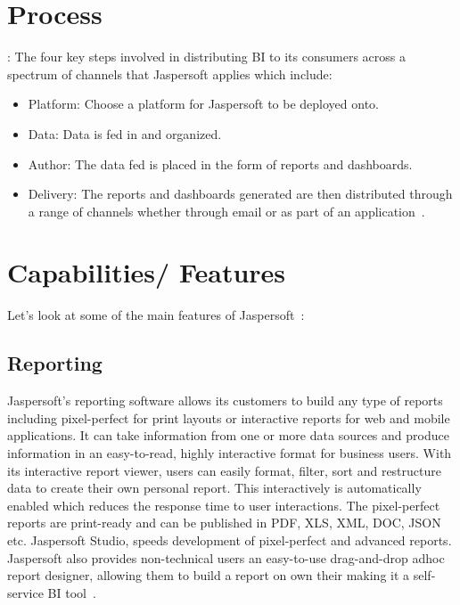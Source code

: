 \section{Process~\cite{hid-sp18-516-www-quick-start-video}}:
The four key steps involved in distributing BI to its consumers across a
spectrum of channels that Jaspersoft applies which include:
\begin{itemize} \item Platform: Choose a platform for Jaspersoft to be deployed onto.
\item Data: Data is fed in and organized. 
\item Author: The data fed is placed in the form of reports and dashboards.
\item Delivery: The reports and dashboards generated are then distributed
through a range of channels whether through email or as part of an
application~\cite{hid-sp18-516-www-quick-start-video}. \end{itemize}


\section{Capabilities/ Features}
Let's look at some of the main features of
Jaspersoft~\cite{hid-sp18-516-www-jaspersoft-features}:

\subsection{Reporting}
Jaspersoft's reporting software allows its customers to build any type of
reports including pixel-perfect for print layouts or interactive reports for web
and mobile applications. It can take information from one or more data sources
and produce information in an easy-to-read, highly interactive format for
business users. With its interactive report viewer, users can easily format,
filter, sort and restructure data to create their own personal report. This
interactively is automatically enabled which reduces the response time to user
interactions. The pixel-perfect reports are print-ready and can be published in
PDF, XLS, XML, DOC, JSON etc. Jaspersoft Studio, speeds development of
pixel-perfect and advanced reports. Jaspersoft also provides non-technical users
an easy-to-use drag-and-drop adhoc report designer, allowing them to build a
report on own their making it a self-service BI
tool~\cite{hid-sp18-516-www-jaspersoft-reporting-software}. 

